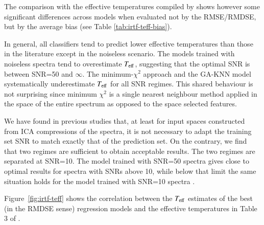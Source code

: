 The comparison with the effective temperatures compiled by
\cite{cesetti} shows however some significant differences across
models when evaluated not by the RMSE/RMDSE, but by the average bias
(see Table \ref{tab:irtf-teff-bias}). 

In general, all classifiers tend to predict lower effective
temperatures than those in the literature except in the noiseless
scenario. The models trained with noiseless spectra tend to
overestimate $T_{\rm eff}$, suggesting that the optimal SNR is between
SNR=50 and $\infty$. The minimum-$\chi^2$ approach and the GA-KNN
model systematically underestimate $T_{\rm eff}$ for all SNR
regimes. This shared behaviour is not surprising since minimum
$\chi^2$ is a single nearest neighbour method applied in the space of
the entire spectrum as opposed to the space selected features.

We have found in previous studies that, at least for input spaces
constructed from ICA compressions of the spectra, it is not necessary
to adapt the training set SNR to match exactly that of the prediction
set. On the contrary, we find that two regimes are sufficient to
obtain acceptable results. The two regimes are separated at
SNR=10. The model trained with SNR=50 spectra gives close to optimal
results for spectra with SNRs above 10, while below that limit the
same situation holds for the model trained with SNR=10
spectra \cite{PaperAna}.


Figure~\ref{fig:irtf-teff} shows the correlation between the $T_{\rm
eff}$ estimates of the best (in the RMDSE sense) regression models and
the effective temperatures in Table 3 of \cite{cesetti}. 


